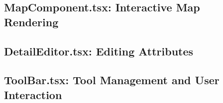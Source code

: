 \subsection{MapComponent.tsx: Interactive Map Rendering}


\subsection{DetailEditor.tsx: Editing Attributes}


\subsection{ToolBar.tsx: Tool Management and User Interaction}

